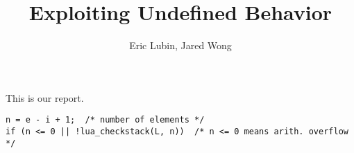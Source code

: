 \documentclass[11pt,twocolumn]{article}
\title{Exploiting Undefined Behavior}
\author{Eric Lubin, Jared Wong}
\begin{document}
\maketitle

This is our report.

\begin{lstlisting}
n = e - i + 1;  /* number of elements */
if (n <= 0 || !lua_checkstack(L, n))  /* n <= 0 means arith. overflow */
\end{lstlisting}
\end{document}
